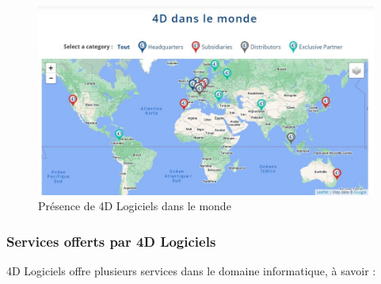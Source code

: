 \begin{figure}[h]
    \centering
    \includegraphics[scale=0.6]{Images/carte.jpg} %
    \caption{Présence de 4D Logiciels dans le monde}
    \label{fig:carte}
\end{figure}

\vspace{3cm}

\subsubsection{Services offerts par 4D Logiciels}
4D Logiciels offre plusieurs services dans le domaine informatique, à savoir :
\\ 


